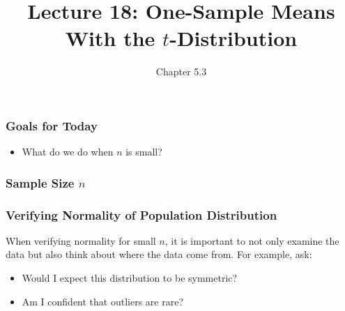 \documentclass[handout]{beamer}
\title{Lecture 18: One-Sample Means With the $t$-Distribution}
\author{Chapter 5.3}
\date{}
\newcommand{\blue}[1]{\textcolor{blue2}{#1}}
\newcommand{\xbar}{\overline{x}}
\begin{document}
\begin{frame}
\titlepage
\end{frame}


\begin{frame}[fragile]
\frametitle{Goals for Today}

\begin{itemize}
\item What do we do when $n$ is small?  
\end{itemize}

\end{frame}


\begin{frame}[fragile]
\frametitle{Sample Size $n$}
%
%
%
%
%

\end{frame}


\begin{frame}[fragile]
\frametitle{Verifying Normality of Population Distribution}

When verifying normality for small $n$, it is important to not only examine the data but also think about where the data come from. For example, ask:
\begin{itemize}
\item Would I expect this distribution to be symmetric?
\item Am I confident that outliers are rare?
\end{itemize}

\end{frame}
\end{document}
